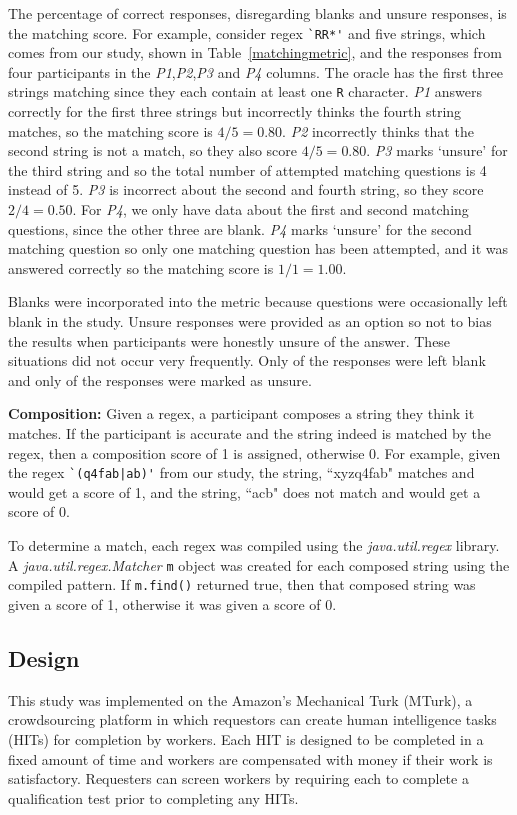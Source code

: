  The percentage of correct responses, disregarding blanks and unsure responses, is the matching score.
 For example, consider regex \verb!`RR*'! and five strings, which comes from our study, shown in Table~\ref{matchingmetric}, and the responses from four participants in the \emph{P1},\emph{P2},\emph{P3} and \emph{P4} columns.
 The oracle has the first three strings matching since they each contain at least one \verb!R! character. \emph{P1} answers correctly for the first three strings but incorrectly thinks the fourth string matches, so the matching score is $4/5 = 0.80$. \emph{P2} incorrectly thinks that the second string is not a match, so they also score $4/5 = 0.80$.  \emph{P3} marks `unsure' for the third string and so the total number of attempted matching questions is 4 instead of 5. \emph{P3} is incorrect about the second and fourth string, so they score $2/4 = 0.50$.  For \emph{P4}, we only have data about the first and second matching questions, since the other three are blank.  \emph{P4} marks `unsure' for the second matching question so only one matching question has been attempted, and it was answered correctly so the matching score is $1/1 = 1.00$.

Blanks were incorporated into the metric because questions were occasionally left blank in the study. Unsure responses were provided as an option so not to bias the  results when participants were honestly unsure of the answer. These situations did not occur very frequently. Only  of the responses were left blank and only  of the responses were marked as unsure.


\textbf{Composition:}
Given a regex, a participant composes a string they think it matches. If the participant is accurate and the string indeed is matched by the regex, then a composition score of 1 is assigned, otherwise 0.  For example, given the regex \verb!`(q4fab|ab)'! from our study, the string, ``xyzq4fab" matches  and would get a score of 1, and the string, ``acb" does not match and would get a score of 0.

To determine a match, each regex was compiled using the \emph{java.util.regex} library. A \emph{java.util.regex.Matcher} \verb!m! object was created for each composed string using the compiled pattern.  If \verb!m.find()! returned true, then that composed string was given a score of 1, otherwise it was given a score of 0.



\subsection{Design}
This study was implemented on the Amazon's Mechanical Turk (MTurk),  a crowdsourcing platform in which requestors can create human intelligence tasks (HITs) for completion by workers. Each HIT is designed to be completed in a fixed amount of time and workers are compensated with money if their work is satisfactory. Requesters can screen workers by requiring each to complete a qualification test prior to completing any HITs.

